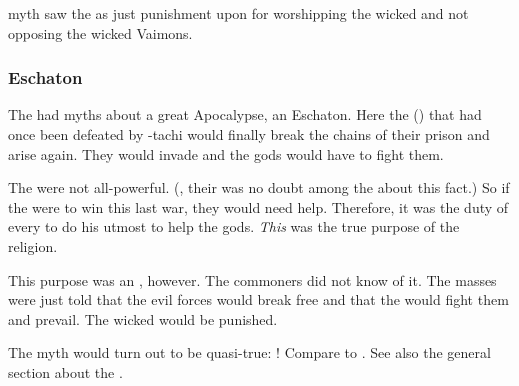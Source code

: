 \Ortaican myth saw the \HundredScourges as just punishment upon \Miithians for worshipping the wicked \Archons and not opposing the wicked Vaimons.





\subsubsection{Eschaton}
The \Ortaicans had myths about a great Apocalypse, an Eschaton. 
Here the  (\banes) that had once been defeated by \Sethicus-tachi would finally break the chains of their prison and arise again.
They would invade \Miith and the gods would have to fight them. 

The \taorthae were not all-powerful. 
(, their was no doubt among the \rethyaxes about this fact.)
So if the \taorthae were to win this last war, they would need help.
Therefore, it was the duty of every \rethyax to do his utmost to help the gods. 
\emph{This} was the true purpose of the \Ortaican religion. 

This purpose was an \arcanum, however. 
The commoners did not know of it.
The masses were just told that the evil forces would break free and that the \taorthae would fight them and prevail.
The wicked would be punished. 

The \Ortaican myth would turn out to be quasi-true:
! 
Compare to . 
See also the general section about the . 

